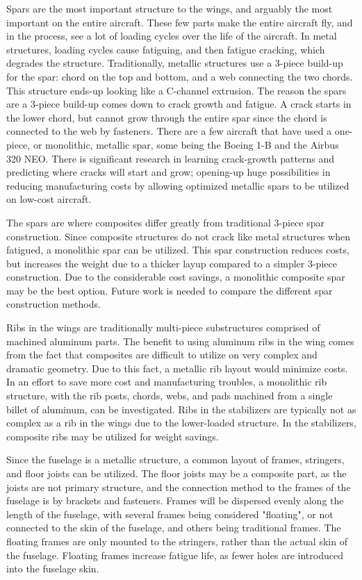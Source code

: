 Spars are the most important structure to the wings, and arguably the most important on the entire aircraft. These few parts make the entire aircraft fly, and in the process, see a lot of loading cycles over the life of the aircraft. In metal structures, loading cycles cause fatiguing, and then fatigue cracking, which degrades the structure. Traditionally, metallic structures use a 3-piece build-up for the spar: chord on the top and bottom, and a web connecting the two chords. This structure ends-up looking like a C-channel extrusion. The reason the spars are a 3-piece build-up comes down to crack growth and fatigue. A crack starts in the lower chord, but cannot grow through the entire spar since the chord is connected to the web by fasteners. There are a few aircraft that have used a one-piece, or monolithic, metallic spar, some being the Boeing 1-B and the Airbus 320 NEO. There is significant research in learning crack-growth patterns and predicting where cracks will start and grow; opening-up huge possibilities in reducing manufacturing costs by allowing optimized metallic spars to be utilized on low-cost aircraft.

\newpage
The spars are where composites differ greatly from traditional 3-piece spar construction. Since composite structures do not crack like metal structures when fatigued, a monolithic spar can be utilized. This spar construction reduces costs, but increases the weight due to a thicker layup compared to a simpler 3-piece construction. Due to the considerable cost savings, a monolithic composite spar may be the best option. Future work is needed to compare the different spar construction methods.

Ribs in the wings are traditionally multi-piece substructures comprised of machined aluminum parts. The benefit to using aluminum ribs in the wing comes from the fact that composites are difficult to utilize on very complex and dramatic geometry. Due to this fact, a metallic rib layout would minimize costs. In an effort to save more cost and manufacturing troubles, a monolithic rib structure, with the rib posts, chords, webs, and pads machined from a single billet of aluminum, can be investigated. Ribs in the stabilizers are typically not as complex as a rib in the wings due to the lower-loaded structure. In the stabilizers, composite ribs may be utilized for weight savings.

Since the fuselage is a metallic structure, a common layout of frames, stringers, and floor joists can be utilized. The floor joists may be a composite part, as the joists are not primary structure, and the connection method to the frames of the fuselage is by brackets and fasteners. Frames will be dispersed evenly along the length of the fuselage, with several frames being considered "floating", or not connected to the skin of the fuselage, and others being traditional frames. The floating frames are only mounted to the stringers, rather than the actual skin of the fuselage. Floating frames increase fatigue life, as fewer holes are introduced into the fuselage skin.

